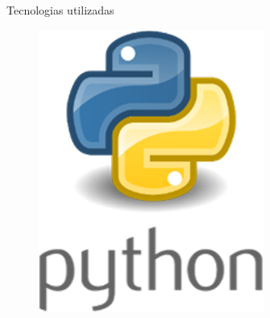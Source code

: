 \documentclass[10pt]{beamer}
\begin{document}
\begin{frame}{Tecnologias utilizadas}
    \begin{multicols}{4}
        \begin{figure}
            \centering
            \includegraphics[width=\linewidth]{demo/images/python.png}
            \label{fig:python}
        \end{figure}
        \begin{figure}
            \centering
            
            \hfill
            

\end{figure}
\end{multicols}
\end{frame}
\end{document}
